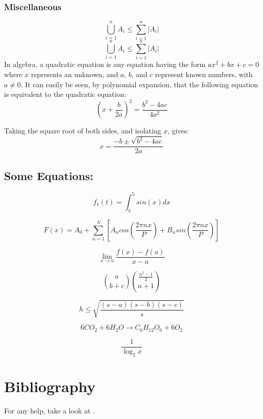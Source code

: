\documentclass[a4paper, 12pt]{article}
\begin{document}
	\subsubsection{Miscellaneous}
		\begin{equation}
			\bigcup\limits_{i=1}^{n} A_i \leq \sum_{i=1}^{n} |A_i|
		\end{equation}
		\begin{equation}
			\bigcup_{i=1}^{n} A_i \leq \sum_{i=1}^{n} |A_i|
		\end{equation}
	In algebra, a quadratic equation is any equation having the form $ax^2+bx+c=0$ where $x$ represents an unknown, and $a$, $b$, and $c$ represent known numbers, with
	$a\neq0$. It can easily be seen, by polynomial expansion, that the following
	equation is equivalent to the quadratic equation:
	$${\left(x+\frac{b}{2a}\right)}^2=\frac{b^2-4ac}{4a^2}$$
	
	Taking the square root of both sides, and isolating $x$, gives:
	\begin{equation}
	x = \frac{-b\pm\sqrt{b^2-4ac}}{2a}
	\end{equation}
	
	\subsection{Some Equations:}
	$$f_1(t) = \int_{3}^{5}sin(x)dx$$
	
	$$F(x) = A_0 + \sum_{n=1}^{N}\left[A_ncos\left(\frac{2\pi nx}{P}\right)+B_nsin\left(\frac{2\pi nx}{P}\right)\right]$$
	
	$$\lim\limits_{x\rightarrow a}\frac{f(x)-f(a)}{x - a}$$
	
	$$\binom{a}{b + c} \binom{\frac{n^2-1}{2}}{n+1}$$
	
	$$h\leq \sqrt{\frac{(s-a)(s-b)(s-c)}{s}}$$
	
	$$6CO_2 + 6H_2O \rightarrow C_6H_{12}O_6 + 6O_2$$
	
	$$\frac{1}{\log_2 x}$$
		
		
	\section{Bibliography}
		For any help, take a look at \cite{Wiki}.
	
	
	
	
\end{document}
